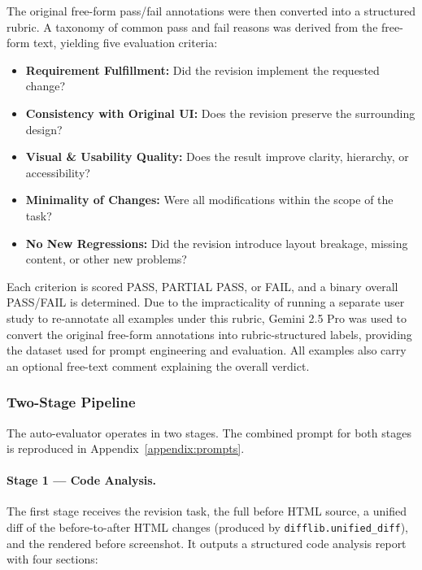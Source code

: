 \documentclass[sigconf,nonacm]{acmart}
\begin{document}
The original free-form pass/fail annotations were then converted into a structured rubric. A taxonomy of common pass and fail reasons was derived from the free-form text, yielding five evaluation criteria:

\begin{itemize}[noitemsep]
  \item \textbf{Requirement Fulfillment:} Did the revision implement the requested change?
  \item \textbf{Consistency with Original UI:} Does the revision preserve the surrounding design?
  \item \textbf{Visual \& Usability Quality:} Does the result improve clarity, hierarchy, or accessibility?
  \item \textbf{Minimality of Changes:} Were all modifications within the scope of the task?
  \item \textbf{No New Regressions:} Did the revision introduce layout breakage, missing content, or other new problems?
\end{itemize}

Each criterion is scored PASS, PARTIAL PASS, or FAIL, and a binary overall PASS/FAIL is determined. Due to the impracticality of running a separate user study to re-annotate all examples under this rubric, Gemini 2.5 Pro was used to convert the original free-form annotations into rubric-structured labels, providing the dataset used for prompt engineering and evaluation. All examples also carry an optional free-text comment explaining the overall verdict.

\subsubsection{Two-Stage Pipeline}

The auto-evaluator operates in two stages. The combined prompt for both stages is reproduced in Appendix~\ref{appendix:prompts}.

\paragraph{Stage 1 — Code Analysis.}
The first stage receives the revision task, the full before HTML source, a unified diff of the before-to-after HTML changes (produced by \texttt{difflib.unified\_diff}), and the rendered before screenshot. It outputs a structured code analysis report with four sections:
\end{document}

